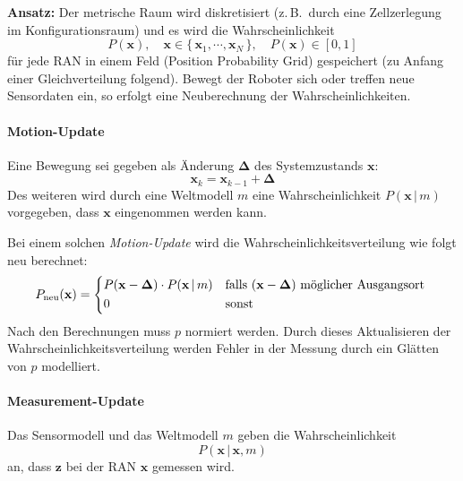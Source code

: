 \documentclass[a4paper, 11pt, accentcolor = tud3b]{tudreport}
\newcommand{\given}{\,\vert\,}
\renewcommand{\vec}[1]{\boldsymbol{\mathbf{#1}}}
\newcommand{\zB}{z.\,B.~}
\begin{document}
					\textbf{Ansatz:} Der metrische Raum wird diskretisiert (\zB durch eine Zellzerlegung im Konfigurationsraum) und es wird die Wahrscheinlichkeit
					\begin{equation*}
						P(\vec{x}),\quad \vec{x} \in \{\, \vec{x}_1, \cdots, \vec{x}_N \,\},\quad P(\vec{x}) \in [0, 1]
					\end{equation*}
					für jede RAN in einem Feld (Position Probability Grid) gespeichert (zu Anfang einer Gleichverteilung folgend). Bewegt der Roboter sich oder treffen neue Sensordaten ein, so erfolgt eine Neuberechnung der Wahrscheinlichkeiten.
					
					\paragraph{Motion-Update}
						Eine Bewegung sei gegeben als Änderung \( \vec{\Delta} \) des Systemzustands \(\vec{x}\):
						\begin{equation*}
							\vec{x}_k = \vec{x}_{k - 1} + \vec{\Delta}
						\end{equation*}
						Des weiteren wird durch eine Weltmodell \(m\) eine Wahrscheinlichkeit \( P(\vec{x} \given m) \) vorgegeben, dass \(\vec{x}\) eingenommen werden kann.
						
						Bei einem solchen \emph{Motion-Update} wird die Wahrscheinlichkeitsverteilung wie folgt neu berechnet:
						\begin{equation*}
							P_\text{neu}(\vec{x}) =
								\begin{cases*}
									P(\vec{x} - \vec{\Delta}) \cdot P(\vec{x} \given m) & falls \( (\vec{x} - \vec{\Delta}) \) möglicher Ausgangsort \\
									0 & sonst
								\end{cases*}
						\end{equation*}
						Nach den Berechnungen muss \(p\) normiert werden. Durch dieses Aktualisieren der Wahrscheinlichkeitsverteilung werden Fehler in der Messung durch ein Glätten von \( p \) modelliert.
					
					\paragraph{Measurement-Update}
						Das Sensormodell und das Weltmodell \(m\) geben die Wahrscheinlichkeit
						\begin{equation*}
							P(\vec{x} \given \vec{x}, m)
						\end{equation*}
						an, dass \( \vec{z} \) bei der RAN \( \vec{x} \) gemessen wird.
						
\end{document}
